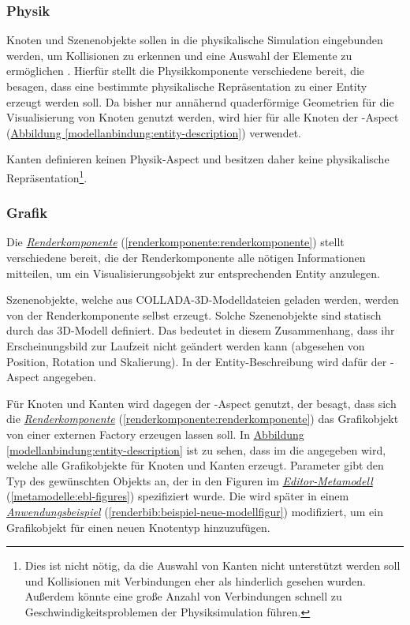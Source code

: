 \documentclass[a4paper,10pt]{sphinxmanual}
\begin{document}
\subsubsection{Physik}
\label{modellanbindung:physik}
Knoten und Szenenobjekte sollen in die physikalische Simulation eingebunden werden, um Kollisionen zu erkennen und eine Auswahl der Elemente zu ermöglichen \cite{uli} \cite{buchi}.
Hierfür stellt die Physikkomponente verschiedene  bereit, die besagen, dass eine bestimmte physikalische Repräsentation zu einer Entity erzeugt werden soll.
Da bisher nur annähernd quaderförmige Geometrien für die Visualisierung von Knoten genutzt werden, wird hier für alle Knoten der -Aspect (\hyperref[modellanbindung:entity-description]{Abbildung  \ref*{modellanbindung:entity-description}}) verwendet.

Kanten definieren keinen Physik-Aspect und besitzen daher keine physikalische Repräsentation\footnote{
Dies ist nicht nötig, da die Auswahl von Kanten nicht unterstützt werden soll und Kollisionen mit Verbindungen eher als hinderlich gesehen wurden. Außerdem könnte eine große Anzahl von Verbindungen schnell zu Geschwindigkeitsproblemen der Physiksimulation führen.
}.


\subsubsection{Grafik}
\label{modellanbindung:grafik}
Die {\hyperref[renderkomponente:renderkomponente]{\emph{Renderkomponente}}} (\autoref*{renderkomponente:renderkomponente}) stellt verschiedene  bereit, die der Renderkomponente alle nötigen Informationen mitteilen, um ein Visualisierungsobjekt zur entsprechenden Entity anzulegen.

Szenenobjekte, welche aus COLLADA-3D-Modelldateien geladen werden, werden von der Renderkomponente selbst erzeugt.
Solche Szenenobjekte sind statisch durch das 3D-Modell definiert.
Das bedeutet in diesem Zusammenhang, dass ihr Erscheinungsbild zur Laufzeit nicht geändert werden kann (abgesehen von Position, Rotation und Skalierung).
In der Entity-Beschreibung wird dafür der -Aspect angegeben.

Für Knoten und Kanten wird dagegen der -Aspect genutzt, der besagt, dass sich die {\hyperref[renderkomponente:renderkomponente]{\emph{Renderkomponente}}} (\autoref*{renderkomponente:renderkomponente}) das Grafikobjekt von einer externen Factory erzeugen lassen soll.
In \hyperref[modellanbindung:entity-description]{Abbildung  \ref*{modellanbindung:entity-description}} ist zu sehen, dass im  die  angegeben wird, welche alle Grafikobjekte für Knoten und Kanten erzeugt.
Parameter  gibt den Typ des gewünschten Objekts an, der in den Figuren im {\hyperref[metamodelle:ebl-figures]{\emph{Editor-Metamodell}}} (\autoref*{metamodelle:ebl-figures}) spezifiziert wurde.
Die  wird später in einem {\hyperref[renderbib:beispiel-neue-modellfigur]{\emph{Anwendungsbeispiel}}} (\autoref*{renderbib:beispiel-neue-modellfigur}) modifiziert, um ein Grafikobjekt für einen neuen Knotentyp hinzuzufügen.
\end{document}
